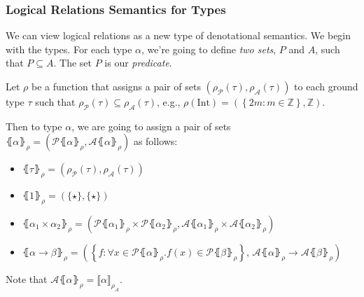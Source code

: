 \documentclass[aspectratio=169]{beamer}
\begin{document}
\begin{frame}
\frametitle{Logical Relations Semantics for Types}

We can view logical relations as a new type of denotational semantics.
We begin with the types.
For each type $\alpha$, we're going to define \emph{two sets}, $P$ and $A$, such that $P \subseteq A$.
The set $P$ is our \emph{predicate}.

\pause
\medskip

Let $\rho$ be a function that assigns a pair of sets $\left(\rho_{\mathcal{P}}(\tau), \rho_{\mathcal{A}}(\tau)\right)$ to each ground type $\tau$ such that $\rho_{\mathcal{P}}(\tau) \subseteq \rho_{\mathcal{A}}(\tau)$, e.g., $\rho(\text{Int}) = \left(\left\{2m : m \in \mathbb{Z}\right\}, \mathbb{Z}\right)$.

\pause
\medskip

Then to type $\alpha$, we are going to assign a pair of sets $\lBrace \alpha \rBrace_{\rho} = \left(\mathcal{P}\lBrace \alpha \rBrace_{\rho}, \mathcal{A}\lBrace \alpha \rBrace_{\rho}\right)$ as follows:

\begin{itemize}
    \item $\lBrace \tau \rBrace_{\rho} = \left(\rho_{\mathcal{P}}(\tau), \rho_{\mathcal{A}}(\tau)\right)$
    \item $\lBrace 1 \rBrace_{\rho} = \left(\{\star\}, \{\star\}\right)$
    \item $\lBrace \alpha_1 \times \alpha_2 \rBrace_{\rho} = \left(\mathcal{P}\lBrace \alpha_1 \rBrace_{\rho} \times \mathcal{P}\lBrace \alpha_2 \rBrace_{\rho}, \mathcal{A}\lBrace \alpha_1 \rBrace_{\rho} \times \mathcal{A}\lBrace \alpha_2 \rBrace_{\rho}\right)$
    \item $\lBrace \alpha \rightarrow \beta \rBrace_{\rho} = \left(\left\{ f : \forall x \in \mathcal{P}\lBrace \alpha \rBrace_{\rho}. f(x) \in \mathcal{P}\lBrace \beta \rBrace_{\rho} \right\},\, \mathcal{A}\lBrace \alpha \rBrace_{\rho} \rightarrow \mathcal{A}\lBrace \beta \rBrace_{\rho}\right)$
\end{itemize}

Note that $\mathcal{A}\lBrace \alpha \rBrace_{\rho} = \llbracket\alpha \rrbracket_{\rho_{\mathcal{A}}}$.

\end{frame}
\end{document}
